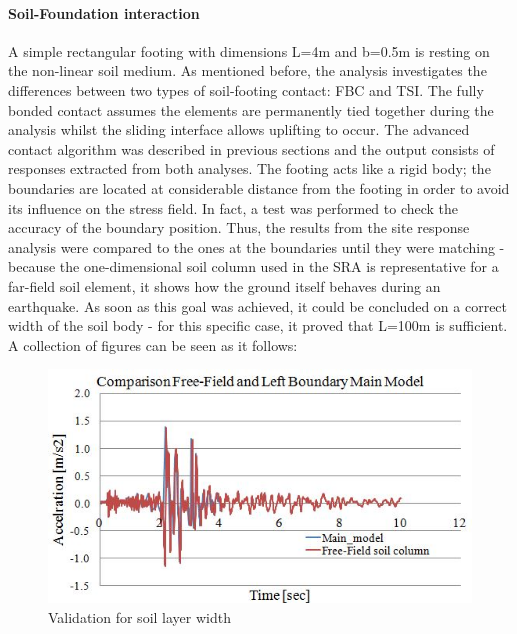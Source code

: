 \paragraph{Soil-Foundation interaction}
A simple rectangular footing with dimensions L=4m and b=0.5m is resting on the non-linear soil medium. As mentioned before, the analysis investigates the differences between two types of soil-footing contact: FBC and TSI. The fully bonded contact assumes the elements are permanently tied together during the analysis whilst the sliding interface allows uplifting to occur. The advanced contact algorithm was described in previous sections and the output consists of responses extracted from both analyses. The footing acts like a rigid body; the boundaries are located at considerable distance from the footing in order to avoid its influence on the stress field. In fact, a test was performed to check the accuracy of the boundary position. Thus, the results from the site response analysis were compared to the ones at the boundaries until they were matching - because the one-dimensional soil column used in the SRA is representative for a far-field soil element, it shows how the ground itself behaves during an earthquake. As soon as this goal was achieved, it could be concluded on a correct width of the soil body - for this specific case, it proved that L=100m is sufficient. A collection of figures can be seen as it follows:

	\begin{figure}[!h]
		\centering
		\includegraphics[width=0.7\linewidth]{"free-field2"}
		\caption{Validation for soil layer width}
		\label{validation}
	\end{figure}

